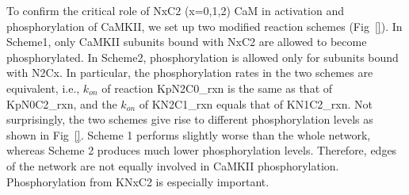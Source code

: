 \documentclass[10pt,letterpaper]{article}
\begin{document}
To confirm the critical role of NxC2 (x=0,1,2) CaM in activation and phosphorylation of CaMKII, we set up two modified reaction schemes (Fig~\ref{}). In Scheme1, only CaMKII subunits bound with NxC2 are allowed to become phosphorylated. In Scheme2, phosphorylation is allowed only for subunits bound with N2Cx. In particular, the phosphorylation rates in the two schemes are equivalent, i.e., $k_{on}$ of reaction KpN2C0_rxn is the same as that of KpN0C2_rxn, and the $k_{on}$ of KN2C1_rxn equals that of KN1C2_rxn. Not surprisingly, the two schemes give rise to different phosphorylation levels as shown in Fig~\ref{}. Scheme 1 performs slightly worse than the whole network, whereas Scheme 2 produces much lower phosphorylation levels. Therefore, edges of the network are not equally involved in CaMKII phosphorylation. Phosphorylation from KNxC2 is especially important.  
\end{document}

